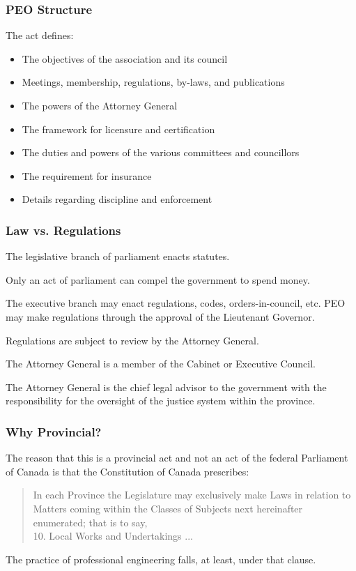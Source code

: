 \begin{frame}
\frametitle{PEO Structure}

The act defines:

\begin{itemize}
\item The objectives of the association and its council
\item Meetings, membership, regulations, by-laws, and publications
\item The powers of the Attorney General
\item The framework for licensure and certification
\item The duties and powers of the various committees and councillors
\item The requirement for insurance
\item Details regarding discipline and enforcement
\end{itemize}

\end{frame}



\begin{frame}
\frametitle{Law vs. Regulations}

The legislative branch of parliament enacts statutes.

Only an act of parliament can compel the government to spend money.

The executive branch may enact regulations, codes, orders-in-council, etc.
PEO may make regulations through the approval of the Lieutenant Governor.

Regulations are subject to review by the Attorney General.

The Attorney General is a member of the Cabinet or Executive Council.

The Attorney General is the chief legal advisor to the government with the responsibility for the oversight of the justice system within the province.


\end{frame}



\begin{frame}
\frametitle{Why Provincial?}


The reason that this is a provincial act and not an act of the federal Parliament of Canada is that the Constitution of Canada prescribes:

\begin{quote}  
In each Province the Legislature may exclusively make Laws in
		relation to Matters coming within the Classes of Subjects next
		hereinafter enumerated; that is to say,\\
				10.	Local Works and Undertakings ...
\end{quote}

	The practice of professional engineering falls, at least, under that clause.

\end{frame}



